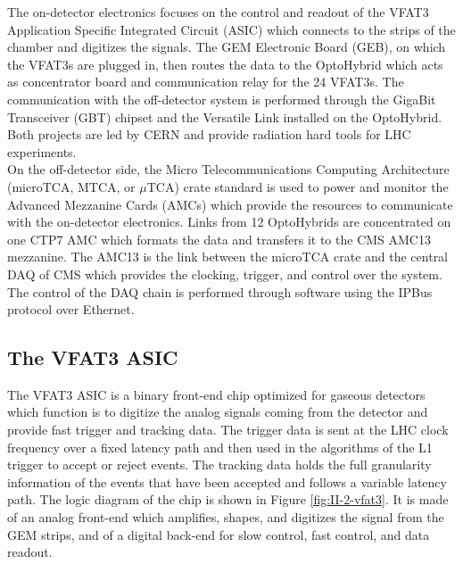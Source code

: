     The on-detector electronics focuses on the control and readout of the VFAT3 Application Specific Integrated Circuit (ASIC) which connects to the strips of the chamber and digitizes the signals. The GEM Electronic Board (GEB), on which the VFAT3s are plugged in, then routes the data to the OptoHybrid which acts as concentrator board and communication relay for the 24 VFAT3s. The communication with the off-detector system is performed through the GigaBit Transceiver (GBT) chipset and the Versatile Link installed on the OptoHybrid. Both projects are led by CERN and provide radiation hard tools for LHC experiments. \\

    On the off-detector side, the Micro Telecommunications Computing Architecture (microTCA, MTCA, or $\mu$TCA) \cite{PICMG} crate standard is used to power and monitor the Advanced Mezzanine Cards (AMCs) which provide the resources to communicate with the on-detector electronics. Links from 12 OptoHybrids are concentrated on one CTP7 AMC which formats the data and transfers it to the CMS AMC13 mezzanine. The AMC13 is the link between the microTCA crate and the central DAQ of CMS which provides the clocking, trigger, and control over the system. The control of the DAQ chain is performed through software using the IPBus protocol over Ethernet.

    \subsection{The VFAT3 ASIC}

      The VFAT3 ASIC is a binary front-end chip optimized for gaseous detectors which function is to digitize the analog signals coming from the detector and provide fast trigger and tracking data. The trigger data is sent at the LHC clock frequency over a fixed latency path and then used in the algorithms of the L1 trigger to accept or reject events. The tracking data holds the full granularity information of the events that have been accepted and follows a variable latency path. The logic diagram of the chip is shown in Figure \ref{fig:II-2-vfat3}. It is made of an analog front-end which amplifies, shapes, and digitizes the signal from the GEM strips, and of a digital back-end for slow control, fast control, and data readout. \\

